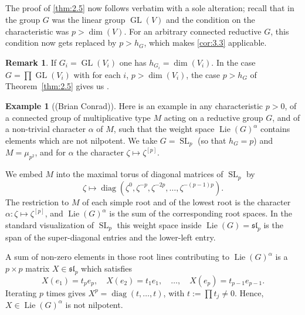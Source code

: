 \documentclass[11pt,a4paper]{article}
\theoremstyle{plain}
\theoremstyle{definition}
\newtheorem{example}[theorem]{Example}
\newtheorem{remark}[theorem]{Remark}
\DeclareMathOperator{\diag}{diag}
\DeclareMathOperator{\Lie}{Lie}
\DeclareMathOperator{\GL}{GL}
\DeclareMathOperator{\SL}{SL}
\begin{document}
\subsection{} \label{sec:3.4}
The proof of \ref{thm:2.5} now follows \cite[pages~594--599]{D} verbatim with a sole alteration; recall that in \cite{D} the group $G$ was the linear group $\GL(V)$ and the condition on the characteristic was $p > \dim(V)$. For an arbitrary connected reductive $G$, this condition now gets replaced by $p > h_G$, which makes \ref{cor:3.3} applicable.

\begin{remark} \label{rem:3.5}
If $G_i = \GL(V_i)$ one has $h_{G_i} = \dim(V_i)$. In the case $G = \prod \GL(V_i)$ with for each $i$, $p > \dim(V_i)$, the case $p > h_G$ of Theorem~\ref{thm:2.5} gives us \cite[Theorem~1.7]{D}.
\end{remark}

\begin{example}[(Brian Conrad)] \label{ex:3.6}
Here is an example in any characteristic $p > 0$, of a connected group of multiplicative type $M$ acting on a reductive group $G$, and of a non-trivial character $\alpha$ of $M$, such that the weight space $\Lie(G)^\alpha$ contains elements which are not nilpotent. We take $G = \SL_p$ (so that $h_G = p$) and $M = \mu_{p^2}$, and for $\alpha$ the character $\zeta \mapsto \zeta^{[p]}$.

We embed $M$ into the maximal torus of diagonal matrices of $\SL_p$ by
\[
\zeta \mapsto \diag(\zeta^0, \zeta^{-p}, \zeta^{-2p}, \ldots, \zeta^{-(p-1)p}).
\]
The restriction to $M$ of each simple root and of the lowest root is the character $\alpha : \zeta \mapsto \zeta^{[p]}$, and $\Lie(G)^\alpha$ is the sum of the corresponding root spaces. In the standard visualization of $\SL_p$ this weight space inside $\Lie(G) = \mathfrak{sl}_p$ is the span of the super-diagonal entries and the lower-left entry.

A sum of non-zero elements in those root lines contributing to $\Lie(G)^\alpha$ is a $p \times p$ matrix $X \in \mathfrak{sl}_p$ which satisfies
\begin{equation} \label{eq:3.6.1}
X(e_1) = t_p e_p, \quad X(e_2) = t_1 e_1, \quad \ldots, \quad X(e_p) = t_{p-1} e_{p-1}.
\end{equation}
Iterating $p$ times gives $X^p = \diag(t, \ldots, t)$, with $t := \prod t_j \neq 0$. Hence, $X \in \Lie(G)^\alpha$ is not nilpotent.
\end{example}
\end{document}
